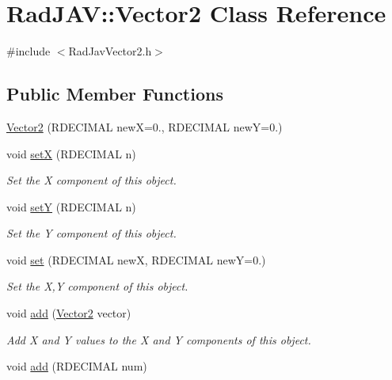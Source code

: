 \hypertarget{class_rad_j_a_v_1_1_vector2}{}\section{Rad\+J\+AV\+:\+:Vector2 Class Reference}
\label{class_rad_j_a_v_1_1_vector2}


{\ttfamily \#include $<$Rad\+Jav\+Vector2.\+h$>$}

\subsection*{Public Member Functions}
\begin{DoxyCompactItemize}
\item 
\hyperlink{class_rad_j_a_v_1_1_vector2_a4b5e87d419a018009ee3258114ac6c21}{Vector2} (R\+D\+E\+C\+I\+M\+AL newX=0., R\+D\+E\+C\+I\+M\+AL newY=0.)
\item 
void \hyperlink{class_rad_j_a_v_1_1_vector2_a1ff6f0708a8b8451c5217e54d85f244d}{setX} (R\+D\+E\+C\+I\+M\+AL n)
\begin{DoxyCompactList}\small\item\em Set the X component of this object. \end{DoxyCompactList}\item 
void \hyperlink{class_rad_j_a_v_1_1_vector2_a787c3054983fe12b59af032728acd16d}{setY} (R\+D\+E\+C\+I\+M\+AL n)
\begin{DoxyCompactList}\small\item\em Set the Y component of this object. \end{DoxyCompactList}\item 
void \hyperlink{class_rad_j_a_v_1_1_vector2_aaf46e8ea7e2ea888ef92938ff00ea717}{set} (R\+D\+E\+C\+I\+M\+AL newX, R\+D\+E\+C\+I\+M\+AL newY=0.)
\begin{DoxyCompactList}\small\item\em Set the X,Y component of this object. \end{DoxyCompactList}\item 
void \hyperlink{class_rad_j_a_v_1_1_vector2_a3f9387eeaed21e53850f888ccc36e0a2}{add} (\hyperlink{class_rad_j_a_v_1_1_vector2}{Vector2} vector)
\begin{DoxyCompactList}\small\item\em Add X and Y values to the X and Y components of this object. \end{DoxyCompactList}\item 
void \hyperlink{class_rad_j_a_v_1_1_vector2_af69e5c5d4ea3b00a9c56f6e20de48430}{add} (R\+D\+E\+C\+I\+M\+AL num)

\end{DoxyCompactItemize}

